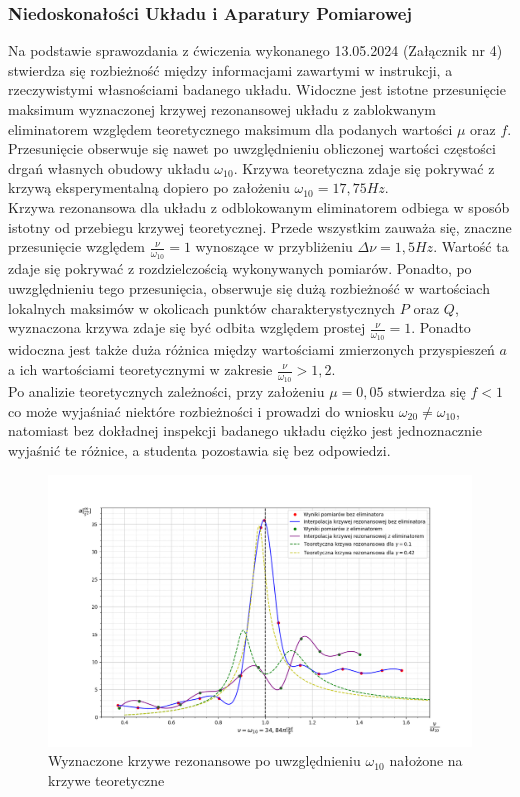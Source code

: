 \documentclass[12pt]{article}
\begin{document}
\subsubsection*{Niedoskonałości Układu i Aparatury Pomiarowej}
Na podstawie sprawozdania z ćwiczenia wykonanego 13.05.2024 (Załącznik nr 4) stwierdza się rozbieżność między informacjami zawartymi w instrukcji, a rzeczywistymi własnościami badanego układu. Widoczne jest istotne przesunięcie maksimum wyznaczonej krzywej rezonansowej układu z zablokwanym eliminatorem względem teoretycznego maksimum dla podanych wartości $\mu$ oraz $f$. Przesunięcie obserwuje się nawet po uwzględnieniu obliczonej wartości częstości drgań własnych obudowy układu $\omega_{10}$. Krzywa teoretyczna zdaje się pokrywać z krzywą eksperymentalną dopiero po założeniu $\omega_{10} = 17,75Hz$. \\Krzywa rezonansowa dla układu z odblokowanym eliminatorem odbiega w sposób istotny od przebiegu krzywej teoretycznej. Przede wszystkim zauważa się, znaczne przesunięcie względem $\frac{\nu}{\omega_{10}} = 1$ wynoszące w przybliżeniu $\Delta\nu =1,5Hz$. Wartość ta zdaje się pokrywać z rozdzielczością wykonywanych pomiarów. Ponadto, po uwzględnieniu tego przesunięcia, obserwuje się dużą rozbieżność w wartościach lokalnych maksimów w okolicach punktów charakterystycznych $P$ oraz $Q$, wyznaczona krzywa zdaje się być odbita względem prostej $\frac{\nu}{\omega_{10}} = 1$. Ponadto widoczna jest także duża różnica między wartościami zmierzonych przyspieszeń $a$ a ich wartościami teoretycznymi w zakresie $\frac{\nu}{\omega_{10}} > 1,2$.\\Po analizie teoretycznych zależności, przy założeniu $\mu = 0,05$  stwierdza się $f<1$ co może wyjaśniać niektóre rozbieżności i prowadzi do wniosku $\omega_{20} \ne \omega_{10}$, natomiast bez dokładnej inspekcji badanego układu ciężko jest jednoznacznie wyjaśnić te różnice, a studenta pozostawia się bez odpowiedzi.

\begin{figure}[H]
		\centering
		\includegraphics[width=\textwidth, left]{combination2}
		\caption{Wyznaczone krzywe rezonansowe po uwzględnieniu $\omega_{10}$ nałożone na krzywe teoretyczne}
		\label{rys:comb1}
\end{figure}
\end{document}

